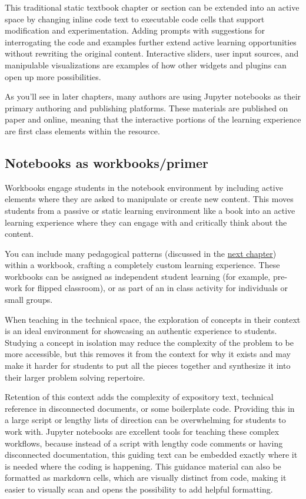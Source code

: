 \documentclass[]{book}
\begin{document}
This traditional static textbook chapter or section can be extended into
an active space by changing inline code text to executable code cells
that support modification and experimentation. Adding prompts with
suggestions for interrogating the code and examples further extend
active learning opportunities without rewriting the original content.
Interactive sliders, user input sources, and manipulable visualizations
are examples of how other widgets and plugins can open up more
possibilities.

As you'll see in later chapters, many authors are using Jupyter
notebooks as their primary authoring and publishing platforms. These
materials are published on paper and online, meaning that the
interactive portions of the learning experience are first class elements
within the resource.

\subsection{Notebooks as
workbooks/primer}\label{notebooks-as-workbooksprimer}

Workbooks engage students in the notebook environment by including
active elements where they are asked to manipulate or create new
content. This moves students from a passive or static learning
environment like a book into an active learning experience where they
can engage with and critically think about the content.

You can include many pedagogical patterns (discussed in the
\protect\hyperlink{catalogue}{next chapter}) within a workbook, crafting
a completely custom learning experience. These workbooks can be assigned
as independent student learning (for example, pre-work for flipped
classroom), or as part of an in class activity for individuals or small
groups.

When teaching in the technical space, the exploration of concepts in
their context is an ideal environment for showcasing an authentic
experience to students. Studying a concept in isolation may reduce the
complexity of the problem to be more accessible, but this removes it
from the context for why it exists and may make it harder for students
to put all the pieces together and synthesize it into their larger
problem solving repertoire.

Retention of this context adds the complexity of expository text,
technical reference in disconnected documents, or some boilerplate code.
Providing this in a large script or lengthy lists of direction can be
overwhelming for students to work with. Jupyter notebooks are excellent
tools for teaching these complex workflows, because instead of a script
with lengthy code comments or having disconnected documentation, this
guiding text can be embedded exactly where it is needed where the coding
is happening. This guidance material can also be formatted as markdown
cells, which are visually distinct from code, making it easier to
visually scan and opens the possibility to add helpful formatting.
\end{document}
